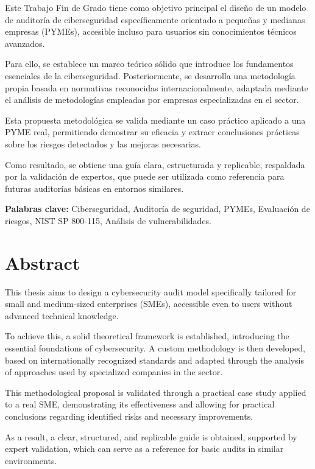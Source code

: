 \documentclass[a4paper, 11pt]{article}
\begin{document}
Este Trabajo Fin de Grado tiene como objetivo principal el diseño de un modelo de auditoría de ciberseguridad específicamente orientado a pequeñas y medianas empresas (PYMEs), accesible incluso para usuarios sin conocimientos técnicos avanzados.

Para ello, se establece un marco teórico sólido que introduce los fundamentos esenciales de la ciberseguridad. Posteriormente, se desarrolla una metodología propia basada en normativas reconocidas internacionalmente, adaptada mediante el análisis de metodologías empleadas por empresas especializadas en el sector.

Esta propuesta metodológica se valida mediante un caso práctico aplicado a una PYME real, permitiendo demostrar su eficacia y extraer conclusiones prácticas sobre los riesgos detectados y las mejoras necesarias.

Como resultado, se obtiene una guía clara, estructurada y replicable, respaldada por la validación de expertos, que puede ser utilizada como referencia para futuras auditorías básicas en entornos similares.

\textbf{Palabras clave:} Ciberseguridad, Auditoría de seguridad, PYMEs, Evaluación de riesgos, NIST SP 800-115, Análisis de vulnerabilidades.
\clearpage

\thispagestyle{nohead}

\section*{Abstract}
This thesis aims to design a cybersecurity audit model specifically tailored for small and medium-sized enterprises (SMEs), accessible even to users without advanced technical knowledge.

To achieve this, a solid theoretical framework is established, introducing the essential foundations of cybersecurity. A custom methodology is then developed, based on internationally recognized standards and adapted through the analysis of approaches used by specialized companies in the sector.

This methodological proposal is validated through a practical case study applied to a real SME, demonstrating its effectiveness and allowing for practical conclusions regarding identified risks and necessary improvements.

As a result, a clear, structured, and replicable guide is obtained, supported by expert validation, which can serve as a reference for basic audits in similar environments.
\end{document}

